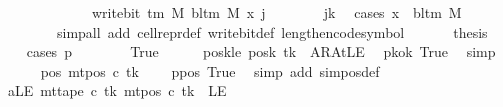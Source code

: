 \begin{isabellebody}
\ \ \ \ \ \ \ \ \ \ \ \ {\isacharequal}{\kern0pt}\ write{\isacharunderscore}{\kern0pt}bit\ {\isacharparenleft}{\kern0pt}{\isasymGamma}{\isacharunderscore}{\kern0pt}tm\ M{\isacharparenright}{\kern0pt}\ {\isacharparenleft}{\kern0pt}bl{\isacharunderscore}{\kern0pt}tm\ M{\isacharparenright}{\kern0pt}\ x\ j{\isachardoublequoteclose}\isanewline
\ \ \ \ \ \ \isamarkupfalse%
\ jk\ \isamarkupfalse%
\ {\isacharparenleft}{\kern0pt}cases\ {\isachardoublequoteopen}x\ {\isacharequal}{\kern0pt}\ bl{\isacharunderscore}{\kern0pt}tm\ M{\isachardoublequoteclose}{\isacharparenright}{\kern0pt}\isanewline
\ \ \ \ \ \ \ \ {\isacharparenleft}{\kern0pt}simp{\isacharunderscore}{\kern0pt}all\ add{\isacharcolon}{\kern0pt}\ cell{\isacharunderscore}{\kern0pt}repr{\isacharunderscore}{\kern0pt}def\ write{\isacharunderscore}{\kern0pt}bit{\isacharunderscore}{\kern0pt}def\ length{\isacharunderscore}{\kern0pt}encode{\isacharunderscore}{\kern0pt}symbol{\isacharparenright}{\kern0pt}\isanewline
\ \ \isamarkupfalse%
\isanewline
\ \ \isamarkupfalse%
\ {\isacharquery}{\kern0pt}thesis\isanewline
\ \ \isamarkupfalse%
\ {\isacharparenleft}{\kern0pt}cases\ {\isachardoublequoteopen}p\ {\isacharequal}{\kern0pt}\ {}{\isachardoublequoteclose}{\isacharparenright}{\kern0pt}\isanewline
\ \ \ \ \isamarkupfalse%
\ True\isanewline
\ \ \ \ \isamarkupfalse%
\ posk{\isacharunderscore}{\kern0pt}le{\isacharcolon}{\kern0pt}\ {\isachardoublequoteopen}posk\ tk\ {\isacharequal}{\kern0pt}\ AR{\isacharunderscore}{\kern0pt}AtLE{\isachardoublequoteclose}\ \isamarkupfalse%
\ pkok\ True\ \isamarkupfalse%
\ simp\isanewline
\ \ \ \ \isamarkupfalse%
\ pos{}{\isacharcolon}{\kern0pt}\ {\isachardoublequoteopen}mt{\isacharunderscore}{\kern0pt}pos\ c{\isacharprime}{\kern0pt}\ tk\ {\isacharequal}{\kern0pt}\ {}{\isachardoublequoteclose}\ \isamarkupfalse%
\ ppos\ True\ \isamarkupfalse%
\ {\isacharparenleft}{\kern0pt}simp\ add{\isacharcolon}{\kern0pt}\ sim{\isacharunderscore}{\kern0pt}pos{\isacharunderscore}{\kern0pt}def{\isacharparenright}{\kern0pt}\isanewline
\ \ \ \ \isamarkupfalse%
\ aLE{\isacharcolon}{\kern0pt}\ {\isachardoublequoteopen}mt{\isacharunderscore}{\kern0pt}tape\ c{\isacharprime}{\kern0pt}\ tk\ {\isacharparenleft}{\kern0pt}mt{\isacharunderscore}{\kern0pt}pos\ c{\isacharprime}{\kern0pt}\ tk{\isacharparenright}{\kern0pt}\ {\isacharequal}{\kern0pt}\ LE{}{\isachardoublequoteclose}\ \isamarkupfalse%

\end{isabellebody}
